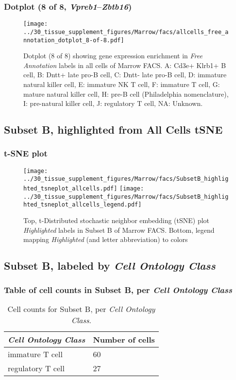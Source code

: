 \clearpage

\subsubsection{Dotplot (8 of 8, \emph{Vpreb1}--\emph{Zbtb16})}
\begin{figure}[h]
\centering
\texttt{[image: ../30\_tissue\_supplement\_figures/Marrow/facs/allcells\_free\_annotation\_dotplot\_8-of-8.pdf]}

\caption{ Dotplot (8 of 8)  showing gene expression enrichment in \emph{Free Annotation} labels in all cells of Marrow FACS. A: Cd3e+ Klrb1+ B cell, B: Dntt+ late pro-B cell, C: Dntt- late pro-B cell, D: immature natural killer cell, E: immature NK T cell, F: immature T cell, G: mature natural killer cell, H: pre-B cell (Philadelphia nomenclature), I: pre-natural killer cell, J: regulatory T cell, NA: Unknown.}
\end{figure}


\clearpage
\subsection{Subset B, highlighted from All Cells tSNE}
\subsubsection{t-SNE plot}
\begin{figure}[h]
\centering
\texttt{[image: ../30\_tissue\_supplement\_figures/Marrow/facs/SubsetB\_highlighted\_tsneplot\_allcells.pdf]}
\texttt{[image: ../30\_tissue\_supplement\_figures/Marrow/facs/SubsetB\_highlighted\_tsneplot\_allcells\_legend.pdf]}
\caption{Top, t-Distributed stochastic neighbor embedding (tSNE) plot  \emph{Highlighted} labels in Subset B of Marrow FACS. Bottom, legend mapping \emph{Highlighted} (and letter abbreviation) to colors}
\end{figure}


\clearpage

\subsection{Subset B, labeled by \emph{Cell Ontology Class}}
\subsubsection{Table of cell counts in Subset B, per \emph{Cell Ontology Class}}\begin{table}[h]
\centering
\label{my-label}
\begin{tabular}{@{}ll@{}}
\toprule

\emph{Cell Ontology Class}& Number of cells \\ \midrule
immature T cell & 60 \\

regulatory T cell & 27 \\
\bottomrule
\end{tabular}
\caption{Cell counts for Subset B, per \emph{Cell Ontology Class}.}
\end{table}

